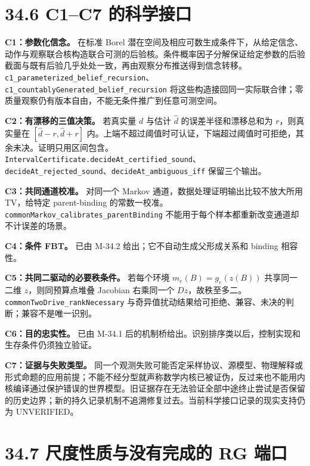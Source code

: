 \documentclass[
  11pt,
  oneside]{book}
\begin{document}
\section{34.6 C1--C7 的科学接口}\label{c1c7-ux7684ux79d1ux5b66ux63a5ux53e3}

\textbf{C1：参数化信念。} 在标准 Borel 潜在空间及相应可数生成条件下，从给定信念、动作与观察联合核构造联合可测的后验核。条件概率因子分解保证给定参数的后验截面与既有后验几乎处处一致，再由观察分布推送得到信念转移。\nolinkurl{c1_parameterized_belief_recursion}、\nolinkurl{c1_countablyGenerated_belief_recursion} 将这些构造接回同一实际联合律；零质量观察仍有版本自由，不能无条件推广到任意可测空间。

\textbf{C2：有漂移的三值决策。} 若真实量 \(d\) 与估计 \(\widehat d\) 的误差半径和漂移总和为 \(r\)，则真实量在 \([\widehat d-r,\widehat d+r]\) 内。上端不超过阈值时可认证，下端超过阈值时可拒绝，其余未决。证明只用区间包含。\nolinkurl{IntervalCertificate.decideAt_certified_sound}、\nolinkurl{decideAt_rejected_sound}、\nolinkurl{decideAt_ambiguous_iff} 保留三个输出。

\textbf{C3：共同通道校准。} 对同一个 Markov 通道，数据处理证明输出比较不放大所用 TV，给特定 parent-binding 的常数一校准。\nolinkurl{commonMarkov_calibrates_parentBinding} 不能用于每个样本都重新改变通道却不计误差的场景。

\textbf{C4：条件 FBT。} 已由 M-34.2 给出；它不自动生成父形成关系和 binding 相容性。

\textbf{C5：共同二驱动的必要秩条件。} 若每个环境 \(m_e(B)=g_e(z(B))\) 共享同一二维 \(z\)，则同预算点堆叠 Jacobian 右乘同一个 \(Dz\)，故秩至多二。\nolinkurl{commonTwoDrive_rankNecessary} 与奇异值扰动结果给可拒绝、兼容、未决的判断；兼容不是唯一识别。

\textbf{C6：目的忠实性。} 已由 M-34.1 后的机制桥给出。识别排序类以后，控制实现和生存条件仍须独立验证。

\textbf{C7：证据与失败类型。} 同一个观测失败可能否定采样协议、源模型、物理解释或形式命题的应用前提；不能不经分型就声称数学内核已被证伪，反过来也不能用内核编译通过保护错误的世界模型。旧证据存在无法验证全部中途终止尝试是否保留的历史边界；新的持久记录机制不追溯修复过去。当前科学接口记录的现实支持仍为 UNVERIFIED。

\section{34.7 尺度性质与没有完成的 RG 端口}\label{ux5c3aux5ea6ux6027ux8d28ux4e0eux6ca1ux6709ux5b8cux6210ux7684-rg-ux7aefux53e3}
\end{document}
